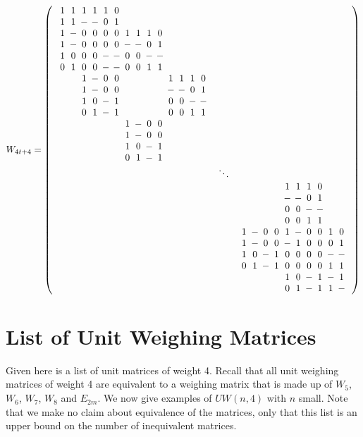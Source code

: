 $$W_{4t+4} =
\left(\begin{array}{lcl}
\Zp\Zp\Zp\Zp\Zp\Zz\Ze\Ze\Ze\Ze\Ze\Ze\Ze\Ze\\
\Zp\Zp\Zm\Zm\Zz\Zp\Ze\Ze\Ze\Ze\Ze\Ze\Ze\Ze\\
\Zp\Zm\Zz\Zz\Zz\Zz\Zp\Zp\Zp\Zz\Ze\Ze\Ze\Ze\\
\Zp\Zm\Zz\Zz\Zz\Zz\Zm\Zm\Zz\Zp\Ze\Ze\Ze\Ze\\
\Zp\Zz\Zz\Zz\Zm\Zm\Zz\Zz\Zm\Zm\Ze\Ze\Ze\Ze\\
\Zz\Zp\Zz\Zz\Zm\Zm\Zz\Zz\Zp\Zp\Ze\Ze\Ze\Ze\\
\Ze\Ze\Zp\Zm\Zz\Zz\Ze\Ze\Ze\Ze\Zp\Zp\Zp\Zz\\
\Ze\Ze\Zp\Zm\Zz\Zz\Ze\Ze\Ze\Ze\Zm\Zm\Zz\Zp\\
\Ze\Ze\Zp\Zz\Zm\Zp\Ze\Ze\Ze\Ze\Zz\Zz\Zm\Zm\\
\Ze\Ze\Zz\Zp\Zm\Zp\Ze\Ze\Ze\Ze\Zz\Zz\Zp\Zp\\
\Ze\Ze\Ze\Ze\Ze\Ze\Zp\Zm\Zz\Zz\Ze\Ze\Ze\Ze\\
\Ze\Ze\Ze\Ze\Ze\Ze\Zp\Zm\Zz\Zz\Ze\Ze\Ze\Ze\\
\Ze\Ze\Ze\Ze\Ze\Ze\Zp\Zz\Zm\Zp\Ze\Ze\Ze\Ze\\
\Ze\Ze\Ze\Ze\Ze\Ze\Zz\Zp\Zm\Zp\Ze\Ze\Ze\Ze\\
& \ddots & ~\\
&&\Ze\Ze\Ze\Ze\Zp\Zp\Zp\Zz\Ze\Ze\\
&&\Ze\Ze\Ze\Ze\Zm\Zm\Zz\Zp\Ze\Ze\\
&&\Ze\Ze\Ze\Ze\Zz\Zz\Zm\Zm\Ze\Ze\\
&&\Ze\Ze\Ze\Ze\Zz\Zz\Zp\Zp\Ze\Ze\\
&&\Zp\Zm\Zz\Zz\Zp\Zm\Zz\Zz\Zp\Zz\\
&&\Zp\Zm\Zz\Zz\Zm\Zp\Zz\Zz\Zz\Zp\\
&&\Zp\Zz\Zm\Zp\Zz\Zz\Zz\Zz\Zm\Zm\\
&&\Zz\Zp\Zm\Zp\Zz\Zz\Zz\Zz\Zp\Zp\\
&&\Ze\Ze\Ze\Ze\Zp\Zz\Zm\Zp\Zm\Zp\\
&&\Ze\Ze\Ze\Ze\Zz\Zp\Zm\Zp\Zp\Zm
\end{array}\right)
$$

\section[Unit Weighing Matrices]{List of Unit Weighing Matrices}
\label{app:unit-wm}

Given here is a list of unit matrices of weight 4. Recall that all unit weighing matrices of weight 4 are equivalent to a weighing matrix that is made up of $W_5$, $W_6$, $W_7$, $W_8$ and $E_{2m}$. We now give examples of $UW(n,4)$ with $n$ small. Note that we make no claim about equivalence  of the matrices, only that this list is an upper bound on the number of inequivalent matrices.

